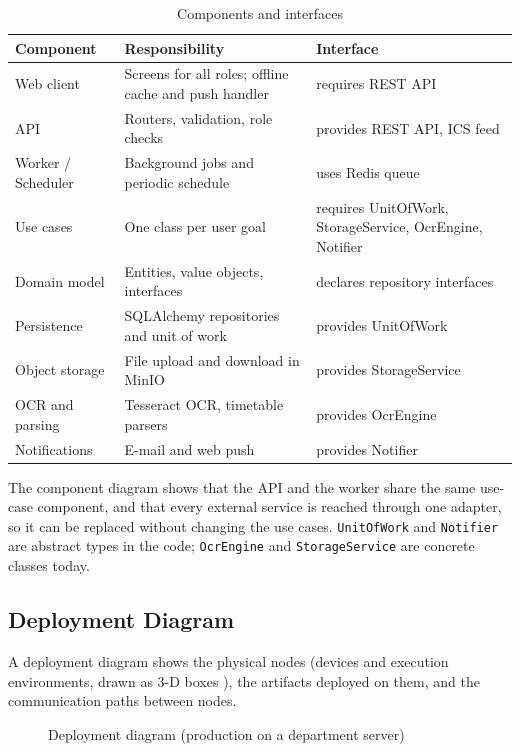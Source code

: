 {\small
{}
\begin{xltabular}{\textwidth}{|p{3.2cm}|Y|p{4.2cm}|}
\caption{Components and interfaces}\\
\hline
\textbf{Component} & \textbf{Responsibility} & \textbf{Interface} \\ \hline
Web client & Screens for all roles; offline cache and push handler & requires REST API \\ \hline
API & Routers, validation, role checks & provides REST API, ICS feed \\ \hline
Worker / Scheduler & Background jobs and periodic schedule & uses Redis queue \\ \hline
Use cases & One class per user goal & requires UnitOfWork, StorageService, OcrEngine, Notifier \\ \hline
Domain model & Entities, value objects, interfaces & declares repository interfaces \\ \hline
Persistence & SQLAlchemy repositories and unit of work & provides UnitOfWork \\ \hline
Object storage & File upload and download in MinIO & provides StorageService \\ \hline
OCR and parsing & Tesseract OCR, timetable parsers & provides OcrEngine \\ \hline
Notifications & E-mail and web push & provides Notifier \\ \hline
\end{xltabular}}

The component diagram shows that the API and the worker share the same use-case component, and that every external service is reached through one adapter, so it can be replaced without changing the use cases. \texttt{UnitOfWork} and \texttt{Notifier} are abstract types in the code; \texttt{OcrEngine} and \texttt{StorageService} are concrete classes today.

\subsection{Deployment Diagram}

A deployment diagram shows the physical nodes (devices and execution environments, drawn as 3-D boxes \symnode), the artifacts deployed on them, and the communication paths between nodes.

\begin{figure}[!htbp]
  \centering
  \resizebox{\textwidth}{!}{}
  \caption{Deployment diagram (production on a department server)}
  \label{fig:deployment}
\end{figure}

